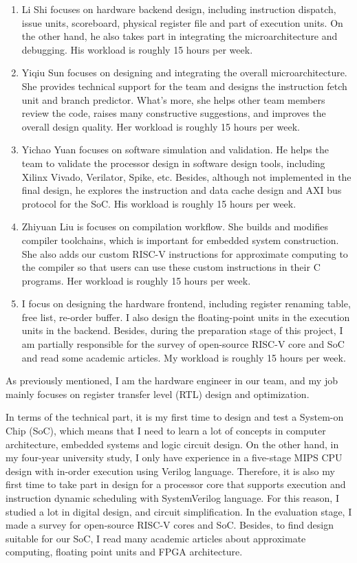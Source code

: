 \begin{enumerate}
  \item Li Shi focuses on hardware backend design, including instruction dispatch, issue units, scoreboard, physical register file and part of execution units. On the other hand, he also takes part in integrating the microarchitecture and debugging. His workload is roughly 15 hours per week.
  \item Yiqiu Sun focuses on designing and integrating the overall microarchitecture. She provides technical support for the team and designs the instruction fetch unit and branch predictor. What’s more, she helps other team members review the code, raises many constructive suggestions, and improves the overall design quality. Her workload is roughly 15 hours per week.
  \item Yichao Yuan focuses on software simulation and validation. He helps the team to validate the processor design in software design tools, including Xilinx Vivado, Verilator, Spike, etc. Besides, although not implemented in the final design, he explores the instruction and data cache design and AXI bus protocol for the SoC. His workload is roughly 15 hours per week.
  \item Zhiyuan Liu is focuses on compilation workflow. She builds and modifies compiler toolchains, which is important for embedded system construction. She also adds our custom RISC-V instructions for approximate computing to the compiler so that users can use these custom instructions in their C programs. Her workload is roughly 15 hours per week.
  \item I focus on designing the hardware frontend, including register renaming table, free list, re-order buffer. I also design the floating-point units in the execution units in the backend. Besides, during the preparation stage of this project, I am partially responsible for the survey of open-source RISC-V core and SoC and read some academic articles. My workload is roughly 15 hours per week.
\end{enumerate}

As previously mentioned, I am the hardware engineer in our team, and my job mainly focuses on register transfer level (RTL) design and optimization.

In terms of the technical part, it is my first time to design and test a System-on Chip (SoC), which means that I need to learn a lot of concepts in computer architecture, embedded systems and logic circuit design. On the other hand, in my four-year university study, I only have experience in a five-stage MIPS CPU design with in-order execution using Verilog language. Therefore, it is also my first time to take part in design for a processor core that supports execution and instruction dynamic scheduling with SystemVerilog language. For this reason, I studied a lot in digital design, and circuit simplification. In the evaluation stage, I made a survey for open-source RISC-V cores and SoC. Besides, to find design suitable for our SoC, I read many academic articles about approximate computing, floating point units and FPGA architecture.

